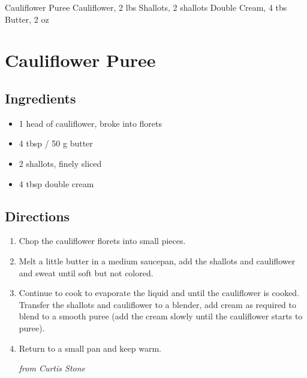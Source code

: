 Cauliflower Puree
  Cauliflower, 2 lbs
  Shallots, 2 shallots
  Double Cream, 4 tbs
  Butter, 2 oz

\section{ Cauliflower Puree }

\subsection{ Ingredients }

\begin{itemize}
  \item 1 head of cauliflower, broke into florets
  \item 4 tbsp / 50 g butter
  \item 2 shallots, finely sliced
  \item 4 tbsp double cream
\end{itemize}

\subsection{ Directions }

\begin{enumerate}
  \item Chop the cauliflower florets into small pieces. 
  \item Melt a little butter in a medium saucepan, add the shallots and cauliflower and sweat until soft but not colored. 
  \item Continue to cook to evaporate the liquid and until the cauliflower is cooked. Transfer the shallots and cauliflower to a blender, add cream as required to blend to a smooth puree (add the cream slowly until the cauliflower starts to puree). 
  \item Return to a small pan and keep warm. 

\textit{from Curtis Stone}
\end{enumerate}
